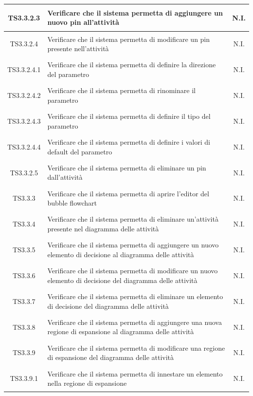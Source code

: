 \documentclass[../PianoDiQualifica.tex]{subfiles}
\begin{document}
\begin{longtable}{|c|>{\centering}p{10cm}|c|}
	\hline
	\hypertarget{TS3.3.2.3}{TS3.3.2.3} & Verificare che il sistema permetta di aggiungere un nuovo pin all'attività & N.I. \\
	\hline
	\hypertarget{TS3.3.2.4}{TS3.3.2.4} & Verificare che il sistema permetta di modificare un pin presente nell'attività & N.I. \\
	\hline
	\hypertarget{TS3.3.2.4.1}{TS3.3.2.4.1} & Verificare che il sistema permetta di definire la direzione del parametro & N.I. \\
	\hline
	\hypertarget{TS3.3.2.4.2}{TS3.3.2.4.2} & Verificare che il sistema permetta di rinominare il parametro & N.I. \\
	\hline
	\hypertarget{TS3.3.2.4.3}{TS3.3.2.4.3} & Verificare che il sistema permetta di definire il tipo del parametro & N.I. \\
	\hline
	\hypertarget{TS3.3.2.4.4}{TS3.3.2.4.4} & Verificare che il sistema permetta di definire i valori di default del parametro & N.I. \\
	\hline
	\hypertarget{TS3.3.2.5}{TS3.3.2.5} & Verificare che il sistema permetta di eliminare un pin dall'attività & N.I. \\
	\hline
	\hypertarget{TS3.3.3}{TS3.3.3} & Verificare che il sistema permetta di aprire l'editor del bubble flowchart & N.I. \\
	\hline
	\hypertarget{TS3.3.4}{TS3.3.4} & Verificare che il sistema permetta di eliminare un'attività presente nel diagramma delle attività & N.I. \\
	\hline
	\hypertarget{TS3.3.5}{TS3.3.5} & Verificare che il sistema permetta di aggiungere un nuovo elemento di decisione al diagramma delle attività & N.I. \\
	\hline
	\hypertarget{TS3.3.6}{TS3.3.6} & Verificare che il sistema permetta di modificare un nuovo elemento di decisione del diagramma delle attività & N.I. \\
	\hline
	\hypertarget{TS3.3.7}{TS3.3.7} & Verificare che il sistema permetta di eliminare un elemento di decisione del diagramma delle attività & N.I. \\
	\hline
	\hypertarget{TS3.3.8}{TS3.3.8} & Verificare che il sistema permetta di aggiungere una nuova regione di espansione al diagramma delle attività & N.I. \\
	\hline
	\hypertarget{TS3.3.9}{TS3.3.9} & Verificare che il sistema permetta di modificare una regione di espansione del diagramma delle attività & N.I. \\
	\hline
	\hypertarget{TS3.3.9.1}{TS3.3.9.1} & Verificare che il sistema permetta di innestare un elemento nella regione di espansione & N.I. \\

\end{longtable}
\end{document}
